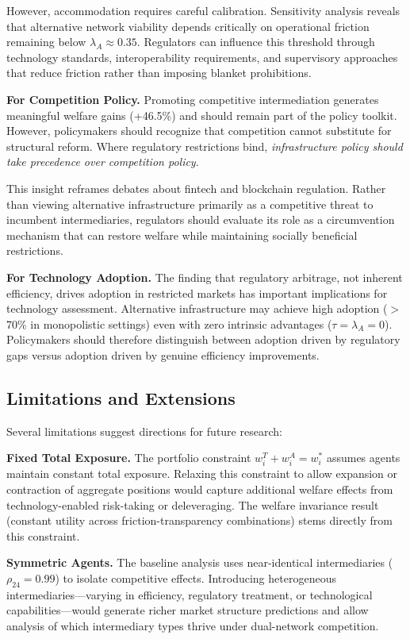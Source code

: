 \documentclass[12pt]{article}
\begin{document}
However, accommodation requires careful calibration. Sensitivity analysis reveals that alternative network viability depends critically on operational friction remaining below $\lambda_A \approx 0.35$. Regulators can influence this threshold through technology standards, interoperability requirements, and supervisory approaches that reduce friction rather than imposing blanket prohibitions.

\textbf{For Competition Policy.} Promoting competitive intermediation generates meaningful welfare gains (+46.5\%) and should remain part of the policy toolkit. However, policymakers should recognize that competition cannot substitute for structural reform. Where regulatory restrictions bind, \textit{infrastructure policy should take precedence over competition policy}.

This insight reframes debates about fintech and blockchain regulation. Rather than viewing alternative infrastructure primarily as a competitive threat to incumbent intermediaries, regulators should evaluate its role as a circumvention mechanism that can restore welfare while maintaining socially beneficial restrictions.

\textbf{For Technology Adoption.} The finding that regulatory arbitrage, not inherent efficiency, drives adoption in restricted markets has important implications for technology assessment. Alternative infrastructure may achieve high adoption ($>$70\% in monopolistic settings) even with zero intrinsic advantages ($\tau = \lambda_A = 0$). Policymakers should therefore distinguish between adoption driven by regulatory gaps versus adoption driven by genuine efficiency improvements.

\subsection{Limitations and Extensions}

Several limitations suggest directions for future research:

\textbf{Fixed Total Exposure.} The portfolio constraint $w_i^T + w_i^A = w_i^*$ assumes agents maintain constant total exposure. Relaxing this constraint to allow expansion or contraction of aggregate positions would capture additional welfare effects from technology-enabled risk-taking or deleveraging. The welfare invariance result (constant utility across friction-transparency combinations) stems directly from this constraint.

\textbf{Symmetric Agents.} The baseline analysis uses near-identical intermediaries ($\rho_{24} = 0.99$) to isolate competitive effects. Introducing heterogeneous intermediaries---varying in efficiency, regulatory treatment, or technological capabilities---would generate richer market structure predictions and allow analysis of which intermediary types thrive under dual-network competition.
\end{document}
